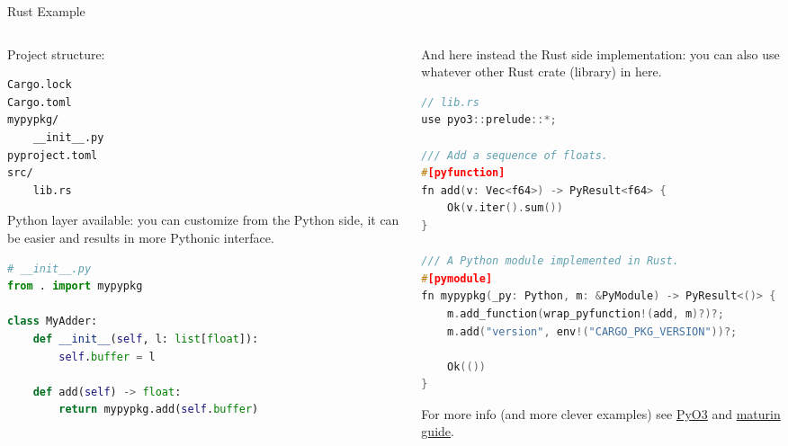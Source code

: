 \documentclass[9pt]{beamer}
\begin{document}
\begin{frame}[fragile]{Rust Example}
    \vspace*{20pt}
    \begin{columns}
        \begin{column}{0.5\textwidth}
            Project structure:
            \begin{lstlisting}[style=mystyle]
Cargo.lock
Cargo.toml
mypypkg/
    __init__.py
pyproject.toml
src/
    lib.rs\end{lstlisting}
            \vspace*{10pt}

            Python layer available: you can customize from the Python side, it
            can be easier and results in more Pythonic interface.
            \begin{lstlisting}[language=Python,style=mystyle]
# __init__.py
from . import mypypkg

class MyAdder:
    def __init__(self, l: list[float]):
        self.buffer = l

    def add(self) -> float:
        return mypypkg.add(self.buffer)\end{lstlisting}
        \end{column}
        \begin{column}{0.5\textwidth}
            And here instead the Rust side implementation: you can also use
            whatever other Rust crate (library) in here.
            \begin{lstlisting}[language=C++,style=mystyle]
// lib.rs
use pyo3::prelude::*;

/// Add a sequence of floats.
#[pyfunction]
fn add(v: Vec<f64>) -> PyResult<f64> {
    Ok(v.iter().sum())
}

/// A Python module implemented in Rust.
#[pymodule]
fn mypypkg(_py: Python, m: &PyModule) -> PyResult<()> {
    m.add_function(wrap_pyfunction!(add, m)?)?;
    m.add("version", env!("CARGO_PKG_VERSION"))?;

    Ok(())
}\end{lstlisting}

            For more info (and more clever examples) see
            \href{https://pyo3.rs/v0.17.1/getting_started.html#running-code}{PyO3}
            and
            \href{https://maturin.rs/project_layout.html#mixed-rustpython-project}{maturin
            guide}.
        \end{column}
    \end{columns}
\end{frame}
\end{document}
